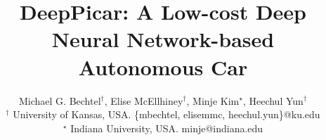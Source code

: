\documentclass[conference]{IEEEtran}
\begin{document}
\title{DeepPicar: A Low-cost Deep Neural Network-based Autonomous Car}

\author{Michael G. Bechtel$^\dagger$, Elise McEllhiney$^\dagger$, Minje Kim$^\star$, Heechul Yun$^\dagger$\\
  $^\dagger$ University of Kansas, USA. \{mbechtel, elisemmc, heechul.yun\}@ku.edu \\
  $^\star$ Indiana University, USA. minje@indiana.edu \\
}


\maketitle
\end{document}
